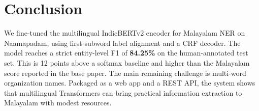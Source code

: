 \section{Conclusion}

We fine-tuned the multilingual IndicBERTv2 encoder for Malayalam NER on
Naamapadam, using first-subword label alignment and a CRF decoder. The model
reaches a strict entity-level F1 of \textbf{84.25\%} on the human-annotated
test set. This is 12 points above a softmax baseline and higher than the
Malayalam score reported in the base paper. The main remaining challenge is
multi-word organization names. Packaged as a web app and a REST API, the
system shows that multilingual Transformers can bring practical information
extraction to Malayalam with modest resources.
